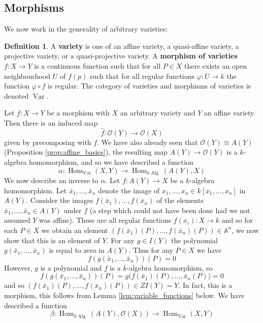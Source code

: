 \documentclass[12pt]{article}
\theoremstyle{plain}
\theoremstyle{definition}
\newtheorem{defn}[thm]{Definition} %
\newcommand{\bb}[1]{\mathbb{#1}}
\newcommand{\call}[1]{\mathcal{#1}}
\newcommand{\lto}{\longrightarrow}
\begin{document}
\subsection{Morphisms}
We now work in the generality of arbitrary varieties:
\begin{defn}
A \textbf{variety} is one of an affine variety, a quasi-affine variety, a projective variety, or a quasi-projective variety. A \textbf{morphism of varieties} $f: X \lto Y$ is a continuous function such that for all $P \in X$ there exists an open neighbourhood $U$ of $f(p)$ such that for all regular functions $\varphi: U \lto k$ the function $\varphi \circ f$ is regular. The category of varieties and morphisms of varieties is denoted $\underline{\operatorname{Var}}$.
\end{defn}
Let $f: X \lto Y$ be a morphism with $X$ an arbitrary variety and $Y$ an affine variety. Then there is an induced map
\[\hat{f}: \call{O}(Y) \lto \call{O}(X)\]
given by precomposing with $f$. We have also already seen that $\call{O}(Y) \cong A(Y)$ (Proposition \ref{prop:affine_basics}), the resulting map $A(Y) \lto \call{O}(Y)$ is a $k$-algebra homomorphism, and so we have described a function
\begin{equation}
    \alpha: \operatorname{Hom}_{\operatorname{Var}}(X,Y) \lto \operatorname{Hom}_{k\operatorname{Alg}}(A(Y),X)
\end{equation}
We now describe an inverse to $\alpha$. Let $f: A(Y) \lto X$ be a $k$-algebra homomorphism. Let $\bar{x}_1,...,\bar{x}_n$ denote the image of $x_1,...,x_n \in k[x_1,...,x_n]$ in $A(Y)$. Consider the images $f(\bar{x}_1),...,f(\bar{x}_n)$ of the elements $\bar{x}_1,...,\bar{x}_n \in A(Y)$ under $f$ (a step which could not have been done had we not assumed $Y$ was affine). These are all regular functions $f(x_i): X \lto k$ and so for each $P \in X$ we obtain an element $(f(\bar{x}_1)(P),...,f(\bar{x}_n)(P)) \in \bb{A}^n$, we now show that this is an element of $Y$. For any $g \in I(Y)$ the polynomial $g(\bar{x}_1,...,\bar{x}_n)$ is equal to zero in $A(Y)$. Thus for any $P \in X$ we have
\[f(g(\bar{x}_1,...,\bar{x}_n))(P) = 0\]
However, $g$ is a polynomial and $f$ is a $k$-algebra homomorphism, so
\[f(g(\bar{x}_1,...,\bar{x}_n))(P) = g\big(f(\bar{x}_1)(P),...,\bar{x}_n(P)\big) = 0\]
and so $(f(\bar{x}_1)(P),...,f(\bar{x}_n)(P)) \in ZI(Y) = Y$.  In fact, this is a morphism, this follows from Lemma \ref{lem:variable_functions} below. We have described a function
\begin{equation}
    \beta: \operatorname{Hom}_{k\operatorname{Alg}}(A(Y),\call{O}(X)) \lto \operatorname{Hom}_{\operatorname{Var}}(X,Y)
\end{equation}
\end{document}
